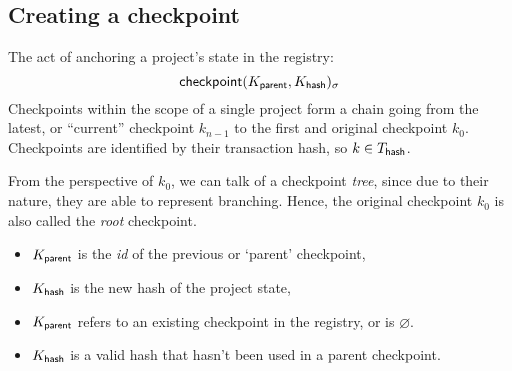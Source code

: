 

\subsection{Creating a checkpoint}
\label{s:checkpoint}
The act of anchoring a project's state in the registry:
\[
    \operatorname{\mathsf{checkpoint}}\lparen K_{\mathsf{parent}}, K_{\mathsf{hash}}\rparen_\sigma
\]
Checkpoints within the scope of a single project form a chain going from the
latest, or ``current'' checkpoint $k_{n-1}$ to the first and original
checkpoint $k_0$. Checkpoints are identified by their transaction hash,
so $k \in T_{\mathsf{hash}}$.

From the perspective of $k_0$, we can talk of a checkpoint \emph{tree}, since
due to their nature, they are able to represent branching. Hence, the original
checkpoint $k_0$ is also called the \emph{root} checkpoint.

\begin{itemize}
    \item $K_{\mathsf{parent}}$ is the \emph{id} of the previous or `parent' checkpoint,
    \item $K_{\mathsf{hash}}$ is the new hash of the project state,
\end{itemize}
\validation
\begin{itemize}
    \item{$K_{\mathsf{parent}}$ refers to an existing checkpoint in the registry,
        or is $\varnothing$.}
    \item{$K_{\mathsf{hash}}$ is a valid hash that hasn't been used in a parent
        checkpoint.}
\end{itemize}

